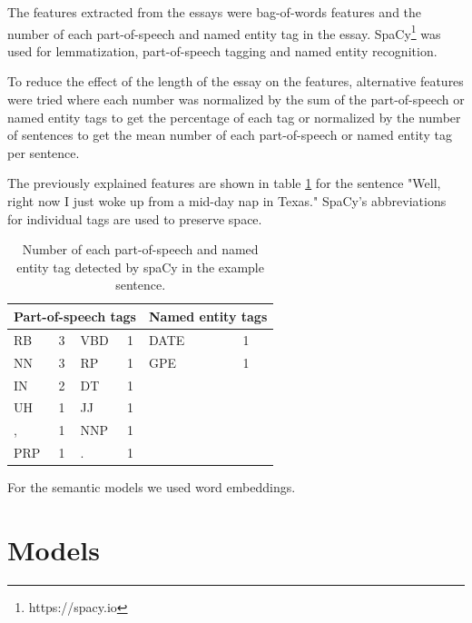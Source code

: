 \documentclass[10pt, a4paper]{article}
\begin{document}
The features extracted from the essays were bag-of-words features and the number of each part-of-speech and named entity tag in the essay.
SpaCy\footnote{https://spacy.io} was used for lemmatization, part-of-speech tagging and named entity recognition.

To reduce the effect of the length of the essay on the features, alternative features were tried where each number was normalized by the sum of the part-of-speech or named entity tags to get the percentage of each tag or normalized by the number of sentences to get the mean number of each part-of-speech or named entity tag per sentence.

The previously explained features are shown in table \ref{example features} for the sentence "Well, right now I just woke up from a mid-day nap in Texas."
SpaCy's abbreviations for individual tags are used to preserve space.

\begin{table}[H]
	\centering
	\caption{Number of each part-of-speech and named entity tag detected by spaCy in the example sentence.}
	\begin{tabular}{llllll}
		\toprule
		\multicolumn{4}{l}{Part-of-speech tags} & \multicolumn{2}{l}{Named entity tags} \\ \midrule
		RB        & 3       & VBD      & 1      & DATE                & 1               \\
		NN        & 3       & RP       & 1      & GPE                 & 1               \\ \cline{5-6} 
		IN        & 2       & DT       & 1      &                     &                 \\
		UH        & 1       & JJ       & 1      &                     &                 \\
		,         & 1       & NNP      & 1      &                     &                 \\
		PRP       & 1       & .        & 1      &                     &                 \\ \cline{1-4}
	\end{tabular}
	\label{example features}
\end{table}

For the semantic models we used word embeddings.

\section{Models}
\end{document}
